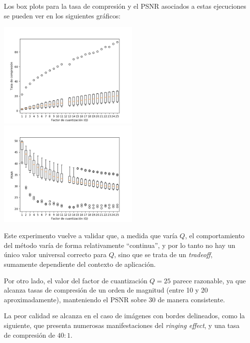\documentclass{article}
\begin{document}
Los box plots para la tasa de compresión y el PSNR
asociados a estas ejecuciones se pueden ver en los siguientes gráficos:
\begin{center}
\includegraphics[width=7cm]{../imgs/output/gray_plots/qalt_rate.png}
\includegraphics[width=7cm]{../imgs/output/gray_plots/qalt_psnr.png}
\end{center}

Este experimento vuelve a validar que, a medida que varía $Q$,
el comportamiento del método varía de forma relativamente ``continua'',
y por lo tanto no hay un único valor universal correcto para $Q$,
sino que se trata de un {\em tradeoff}, sumamente dependiente del
contexto de aplicación.

Por otro lado, el valor del factor de cuantización $Q = 25$
parece razonable,
ya que alcanza tasas de compresión de un orden de magnitud
(entre 10 y 20 aproximadamente), manteniendo el PSNR sobre 30
de manera consistente.

La peor calidad se alcanza en el caso de imágenes con bordes delineados,
como la siguiente, que presenta numerosas manifestaciones del {\em ringing effect},
y una tasa de compresión de $40 : 1$.
\end{document}
